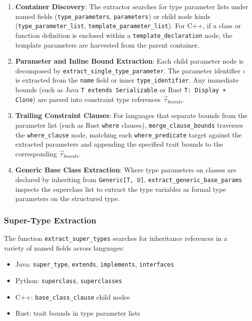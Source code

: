\begin{enumerate}
  \item \textbf{Container Discovery}: The extractor searches for type parameter
    lists under named fields (\texttt{type\_parameters},
    \texttt{parameters}) or child
    node kinds (\texttt{type\_parameter\_list},
    \texttt{template\_parameter\_list}).
    For C++, if a \linebreak class or function definition is enclosed within a
    \texttt{template\_decla}\-\texttt{ration} node, the template parameters are
    harvested from the
    parent container.
  \item \textbf{Parameter and Inline Bound Extraction}: Each child
    parameter node
    is decomposed by \texttt{extract\_single\_type\_parameter}. The
    parameter identifier
    $\iota$ is extracted from the \texttt{name} field or inner
    \texttt{type\_identifier}.
    Any immediate bounds (such as Java \texttt{T extends Serializable} or Rust
    \texttt{T: Display + Clone}) are parsed into constraint type references
    $\vec{\tau}_{bounds}$.
  \item \textbf{Trailing Constraint Clauses}: For languages that separate bounds
    from the parameter list (such as Rust \texttt{where} clauses),
    \texttt{merge\_clause\_bounds} traverses the
    \texttt{where\_clause} node, matching
    each \texttt{where\_predicate} target against the extracted
    parameters and appending
    the specified trait bounds to the corresponding $\vec{\tau}_{bounds}$.
  \item \textbf{Generic Base Class Extraction}: Where type parameters
    on classes are declared by inheriting from \texttt{Generic[T, U]},
    \texttt{extract\_generic\_base\_}\-\texttt{params} inspects the
    superclass list to extract
    the type variables as formal type parameters on the structured type.
\end{enumerate}

\subsubsection{Super-Type Extraction}

The function \texttt{extract\_super\_types} searches for inheritance
references in a variety of named fields across languages:
\begin{itemize}
  \item Java: \texttt{super\_type}, \texttt{extends},
    \texttt{implements}, \texttt{interfaces}
  \item Python: \texttt{superclass}, \texttt{superclasses}
  \item C++: \texttt{base\_class\_clause} child nodes
  \item Rust: trait bounds in type parameter lists
\end{itemize}

